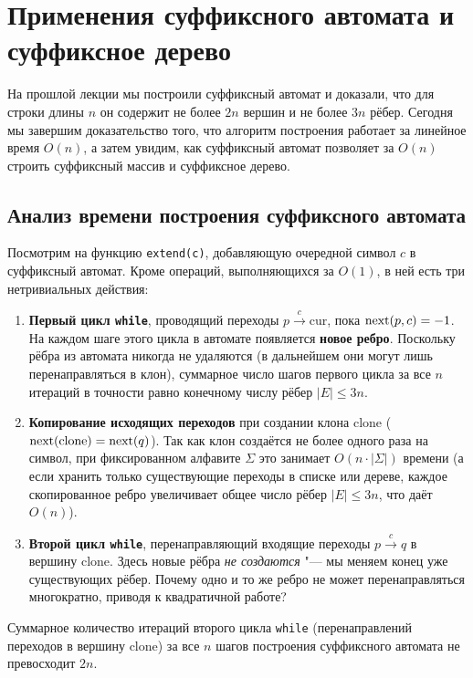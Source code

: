 \section{Применения суффиксного автомата и суффиксное дерево}

На прошлой лекции мы построили суффиксный автомат и доказали, что для строки длины $n$ он содержит не более $2n$ вершин и не более $3n$ рёбер. Сегодня мы завершим доказательство того, что алгоритм построения работает за линейное время $O(n)$, а затем увидим, как суффиксный автомат позволяет за $O(n)$ строить суффиксный массив и суффиксное дерево.

\subsection{Анализ времени построения суффиксного автомата}

Посмотрим на функцию \texttt{extend(c)}, добавляющую очередной символ $c$ в суффиксный автомат. Кроме операций, выполняющихся за $O(1)$, в ней есть три нетривиальных действия:
\begin{enumerate}
    \item \textbf{Первый цикл \texttt{while}}, проводящий переходы $p \xrightarrow{c} \text{cur}$, пока $\operatorname{next}(p, c) = -1$. На каждом шаге этого цикла в автомате появляется \textbf{новое ребро}. Поскольку рёбра из автомата никогда не удаляются (в дальнейшем они могут лишь перенаправляться в клон), суммарное число шагов первого цикла за все $n$ итераций в точности равно конечному числу рёбер $|E| \le 3n$.
    \item \textbf{Копирование исходящих переходов} при создании клона $\text{clone}$ ($\operatorname{next}(\text{clone}) = \operatorname{next}(q)$). Так как клон создаётся не более одного раза на символ, при фиксированном алфавите $\Sigma$ это занимает $O(n \cdot |\Sigma|)$ времени (а если хранить только существующие переходы в списке или дереве, каждое скопированное ребро увеличивает общее число рёбер $|E| \le 3n$, что даёт $O(n)$).
    \item \textbf{Второй цикл \texttt{while}}, перенаправляющий входящие переходы $p \xrightarrow{c} q$ в вершину $\text{clone}$. Здесь новые рёбра \emph{не создаются} "--- мы меняем конец уже существующих рёбер. Почему одно и то же ребро не может перенаправляться многократно, приводя к квадратичной работе?
\end{enumerate}

\begin{theorem}
    Суммарное количество итераций второго цикла \texttt{while} (перенаправлений переходов в вершину $\text{clone}$) за все $n$ шагов построения суффиксного автомата не превосходит $2n$.
\end{theorem}

